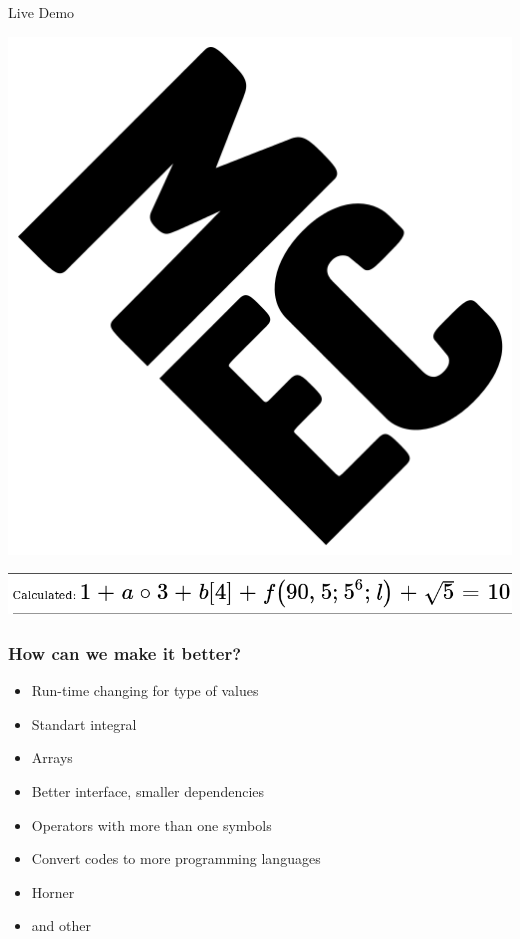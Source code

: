 \documentclass[12pt]{beamer}
\begin{document}
	\begin{frame}
		\begin{center}
			{\Huge Live Demo}
			
			\includegraphics[scale=0.4]{logo2.png}
			
			\includegraphics[scale=0.4]{screeenshot_SRS.png}
		\end{center}
	\end{frame}

	\begin{frame}
	\frametitle{How can we make it better?}
	\begin{itemize}
		\item Run-time changing for type of values
		\item Standart integral
		\item Arrays
		\item Better interface, smaller dependencies
		\item Operators with more than one symbols
		\item Convert codes to more programming languages
		\item Horner
		\item and other
	\end{itemize}
	\end{frame}
\end{document}
